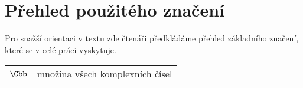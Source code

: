 \chapter*{Přehled použitého značení}

Pro snažší orientaci v textu zde čtenáři předkládáme přehled základního značení, které se v celé práci vyskytuje.
\begin{flushleft}
\begin{longtable}[l]{ll} %
  $\Cbb$                 & množina všech komplexních čísel \\[1mm]
\end{longtable}
\end{flushleft}
